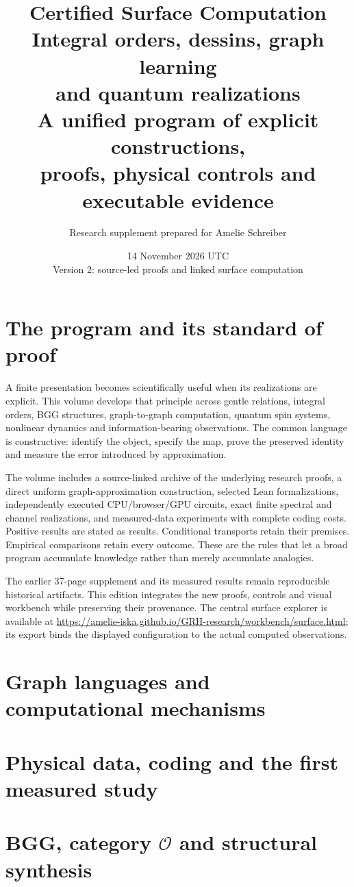 \documentclass[11pt,oneside,openany]{book}
\title{\textbf{Certified Surface Computation}\\[1em]\Large Integral orders, dessins, graph learning\\and quantum realizations\\[1em]\large A unified program of explicit constructions,\\proofs, physical controls and executable evidence}
\author{Research supplement prepared for Amelie Schreiber}
\date{14 November 2026 UTC\\\small Version 2: source-led proofs and linked surface computation}
\begin{document}
\frontmatter\maketitle
\chapter*{The program and its standard of proof}
A finite presentation becomes scientifically useful when its realizations are explicit. This volume develops that principle across gentle relations, integral orders, BGG structures, graph-to-graph computation, quantum spin systems, nonlinear dynamics and information-bearing observations. The common language is constructive: identify the object, specify the map, prove the preserved identity and measure the error introduced by approximation.

The volume includes a source-linked archive of the underlying research proofs, a direct uniform graph-approximation construction, selected Lean formalizations, independently executed CPU/browser/GPU circuits, exact finite spectral and channel realizations, and measured-data experiments with complete coding costs. Positive results are stated as results. Conditional transports retain their premises. Empirical comparisons retain every outcome. These are the rules that let a broad program accumulate knowledge rather than merely accumulate analogies.

The earlier 37-page supplement and its measured results remain reproducible historical artifacts. This edition integrates the new proofs, controls and visual workbench while preserving their provenance. The central surface explorer is available at \url{https://amelie-iska.github.io/GRH-research/workbench/surface.html}; its export binds the displayed configuration to the actual computed observations.
\tableofcontents\mainmatter





\chapter{Graph languages and computational mechanisms}

\chapter{Physical data, coding and the first measured study}



\chapter{BGG, category \texorpdfstring{$\mathcal O$}{O} and structural synthesis}



\appendix
\begingroup\footnotesize\raggedright\endgroup
\end{document}
